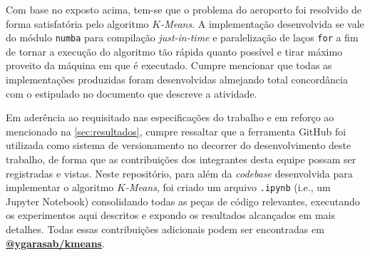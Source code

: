 \documentclass[12pt]{article}
\begin{document}
Com base no exposto acima, tem-se que o problema do aeroporto foi resolvido de forma
satisfatória pelo algoritmo \textit{$K$-Means}. A implementação desenvolvida se vale do módulo \texttt{numba} para compilação \textit{just-in-time} e paralelização de laços \texttt{for} a fim de tornar a execução do algoritmo tão rápida quanto possível e tirar máximo proveito da máquina em que é executado. Cumpre mencionar que todas as implementações produzidas foram desenvolvidas almejando total concordância com o estipulado no documento que descreve a atividade.

Em aderência ao requisitado nas especificações do trabalho e em reforço ao mencionado na \autoref{sec:resultados}, cumpre ressaltar que a ferramenta GitHub foi utilizada como sistema de versionamento no decorrer do desenvolvimento deste trabalho, de forma que as contribuições dos integrantes desta equipe possam ser registradas e vistas. Neste repositório, para além da \textit{codebase} desenvolvida para implementar o algoritmo \textit{$K$-Means}, foi criado um arquivo \texttt{.ipynb} (i.e., um Jupyter Notebook) consolidando todas as peças de código relevantes, executando os experimentos aqui descritos e expondo os resultados alcançados em mais detalhes. Todas essas contribuições adicionais podem ser encontradas em \textbf{\href{https://github.com/ygarasab/kmeans}{@ygarasab/kmeans}}.


\end{document}
